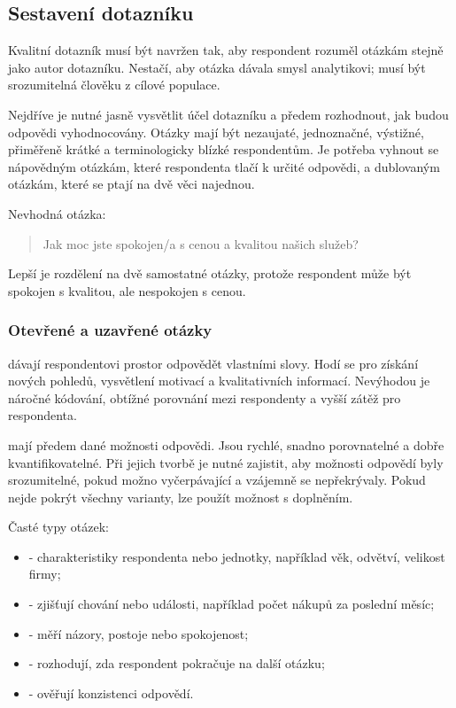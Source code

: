 \subsection{Sestavení dotazníku}
Kvalitní dotazník musí být navržen tak, aby respondent rozuměl otázkám stejně jako autor dotazníku.
Nestačí, aby otázka dávala smysl analytikovi; musí být srozumitelná člověku z cílové populace.

Nejdříve je nutné jasně vysvětlit účel dotazníku a předem rozhodnout, jak budou odpovědi vyhodnocovány.
Otázky mají být nezaujaté, jednoznačné, výstižné, přiměřeně krátké a terminologicky blízké respondentům.
Je potřeba vyhnout se nápovědným otázkám, které respondenta tlačí k určité odpovědi, a dublovaným
otázkám, které se ptají na dvě věci najednou.

Nevhodná otázka:
\begin{quote}
  Jak moc jste spokojen/a s cenou a kvalitou našich služeb?
\end{quote}

Lepší je rozdělení na dvě samostatné otázky, protože respondent může být spokojen s kvalitou, ale
nespokojen s cenou.

\subsubsection{Otevřené a uzavřené otázky}
 dávají respondentovi prostor odpovědět vlastními slovy. Hodí se pro získání
nových pohledů, vysvětlení motivací a kvalitativních informací. Nevýhodou je náročné kódování,
obtížné porovnání mezi respondenty a vyšší zátěž pro respondenta.

 mají předem dané možnosti odpovědi. Jsou rychlé, snadno porovnatelné a dobře
kvantifikovatelné. Při jejich tvorbě je nutné zajistit, aby možnosti odpovědí byly srozumitelné,
pokud možno vyčerpávající a vzájemně se nepřekrývaly. Pokud nejde pokrýt všechny varianty, lze použít
možnost  s doplněním.

Časté typy otázek:
\begin{itemize}
  \item {} - charakteristiky respondenta nebo jednotky, například věk, odvětví,
  velikost firmy;
  \item {} - zjišťují chování nebo události, například počet nákupů za poslední měsíc;
  \item {} - měří názory, postoje nebo spokojenost;
  \item {} - rozhodují, zda respondent pokračuje na další otázku;
  \item {} - ověřují konzistenci odpovědí.
\end{itemize}

